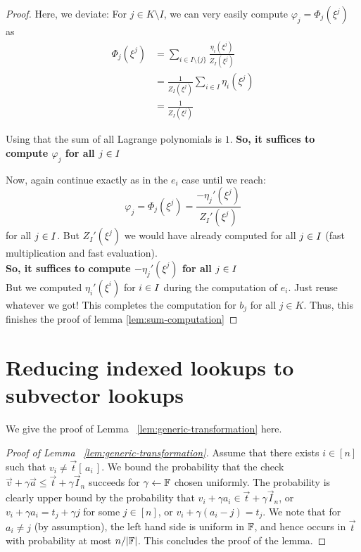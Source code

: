 \begin{proof}
    Here, we deviate: For $j \in K\setminus I$, we can very easily compute $\varphi_j=\Phi_j(\xi^j)$ as
    \begin{align*}
        \Phi_j(\xi^j)&=\sum_{i\in I\setminus \{j\}} \frac{\eta_i(\xi^j)}{Z_I(\xi^j)}\\
        &=\frac{1}{Z_I(\xi^j)} \sum_{i\in I}\eta_i(\xi^j)\\
        &=\frac{1}{Z_I(\xi^j)}
    \end{align*}

    Using that the sum of all Lagrange polynomials is $1$. \textbf{So, it suffices to compute $\varphi_j$ for all $j \in I$}

    Now, again continue exactly as in the $e_i$ case until we reach:
    $$\varphi_j =\Phi_j(\xi^j) = \frac{-\eta_j'(\xi^j)}{Z_I'(\xi^j)}$$
    for all $j \in I$. But $Z_I'(\xi^j)$ we would have already computed for all $j \in I$ (fast multiplication and fast evaluation). \\
    \textbf{So, it suffices to compute $-\eta_j'(\xi^j)$ for all $j \in I$\\}
    But we computed $\eta_i'(\xi^i)$ for $i\in I$ during the computation of $e_i$. Just reuse whatever we got!
    This completes the computation for $b_j$ for all $j \in K$.
    Thus, this finishes the proof of lemma \ref{lem:sum-computation}
\end{proof}


\section{Reducing indexed lookups to subvector lookups}\label{sec:generic-transformation-app}
We give the proof of Lemma ~\ref{lem:generic-transformation} here.
\begin{proof}[Proof of Lemma ~\ref{lem:generic-transformation}]
Assume that there exists $i\in [n]$ such that $v_i\neq \vec{t}[\,a_i\,]$.
 We bound the probability
that the check $\vec{v} + \gamma \vec{a}\leq \vec{t}+\gamma \vec{I}_n$ succeeds for
$\gamma\gets \mathbb{F}$ chosen uniformly. The probability is clearly upper bound by the probability
that $v_i + \gamma a_i\in \vec{t}+\gamma \vec{I}_n$, or $v_i+\gamma a_i=t_j + \gamma j$ for
some $j\in [n]$, or $v_i + \gamma (a_i - j)=t_j$. We note that for $a_i\neq j$ (by assumption),
the left hand side is uniform in $\mathbb{F}$, and hence occurs in $\vec{t}$ with probability at most
$n/|\mathbb{F}|$. This concludes the proof of the lemma.
\end{proof}


